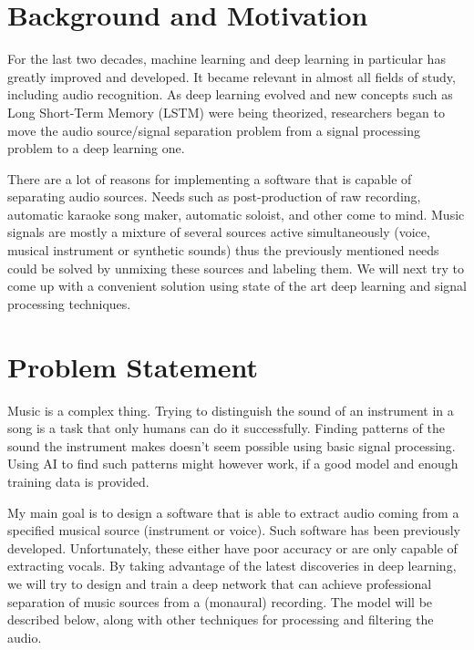 \documentclass[../Thesis.tex]{subfiles}
\begin{document}
 
\section  {Background and Motivation}
For the last two decades, machine learning and deep learning in particular has greatly improved and developed. It became relevant in almost all fields of study, including audio recognition. As deep learning evolved and new concepts such as Long Short-Term Memory (LSTM) were being theorized, researchers began to move the audio source/signal separation problem from a signal processing problem to a deep learning one. 

There are a lot of reasons for implementing a software that is capable of separating audio sources. Needs such as post-production of raw recording, automatic karaoke song maker, automatic soloist, and other come to mind. Music signals are mostly a mixture of several sources active simultaneously (voice, musical instrument or synthetic sounds) thus the previously mentioned needs could be solved by unmixing these sources and labeling them. We will next try to come up with a convenient solution using state of the art deep learning and signal processing techniques.

\section {Problem Statement}
Music is a complex thing. Trying to distinguish the sound of an instrument in a song is a task that only humans can do it successfully. Finding patterns of the sound the instrument makes doesn’t seem possible using basic signal processing. Using AI to find such patterns might however work, if a good model and enough training data is provided.

My main goal is to design a software that is able to extract audio coming from a specified musical source (instrument or voice). Such software has been previously developed. Unfortunately, these either have poor accuracy or are only capable of extracting vocals. By taking advantage of the latest discoveries in deep learning, we will try to design and train a deep network that can achieve professional separation of music sources from a (monaural) recording. The model will be described below, along with other techniques for processing and filtering the audio.
 
\end{document}
